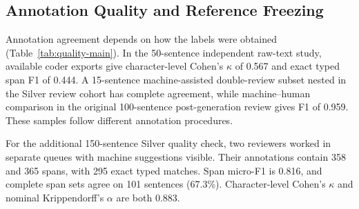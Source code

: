 \subsection{Annotation Quality and Reference Freezing}
\label{sec:annotation-quality}

Annotation agreement depends on how the labels were obtained (Table~\ref{tab:quality-main}). In the 50-sentence independent raw-text study, available coder exports give character-level Cohen's $\kappa$ of 0.567 and exact typed span F1 of 0.444. A 15-sentence machine-assisted double-review subset nested in the Silver review cohort has complete agreement, while machine--human comparison in the original 100-sentence post-generation review gives F1 of 0.959. These samples follow different annotation procedures.

For the additional 150-sentence Silver quality check, two reviewers worked in separate queues with machine suggestions visible. Their annotations contain 358 and 365 spans, with 295 exact typed matches. Span micro-F1 is 0.816, and complete span sets agree on 101 sentences (67.3\%). Character-level Cohen's $\kappa$ and nominal Krippendorff's $\alpha$ are both 0.883.


